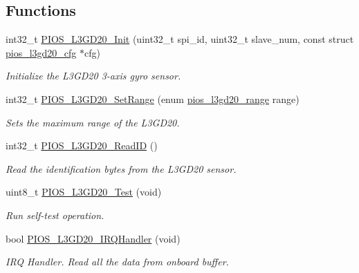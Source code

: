 \subsection*{\-Functions}
\begin{DoxyCompactItemize}
\item 
int32\-\_\-t \hyperlink{group___p_i_o_s___l3_g_d20_gac5608ef1d6d1c639969449e9613ed814}{\-P\-I\-O\-S\-\_\-\-L3\-G\-D20\-\_\-\-Init} (uint32\-\_\-t spi\-\_\-id, uint32\-\_\-t slave\-\_\-num, const struct \hyperlink{structpios__l3gd20__cfg}{pios\-\_\-l3gd20\-\_\-cfg} $\ast$cfg)
\begin{DoxyCompactList}\small\item\em \-Initialize the \-L3\-G\-D20 3-\/axis gyro sensor. \end{DoxyCompactList}\item 
int32\-\_\-t \hyperlink{group___p_i_o_s___l3_g_d20_ga26819f3aff62932a133ff618c3f25ee3}{\-P\-I\-O\-S\-\_\-\-L3\-G\-D20\-\_\-\-Set\-Range} (enum \hyperlink{group___p_i_o_s___l3_g_d20_ga704696d385abb591516d2e31301dad66}{pios\-\_\-l3gd20\-\_\-range} range)
\begin{DoxyCompactList}\small\item\em \-Sets the maximum range of the \-L3\-G\-D20. \end{DoxyCompactList}\item 
int32\-\_\-t \hyperlink{group___p_i_o_s___l3_g_d20_gacbb45ecd0888306f970c7a719cb372c2}{\-P\-I\-O\-S\-\_\-\-L3\-G\-D20\-\_\-\-Read\-I\-D} ()
\begin{DoxyCompactList}\small\item\em \-Read the identification bytes from the \-L3\-G\-D20 sensor. \end{DoxyCompactList}\item 
uint8\-\_\-t \hyperlink{group___p_i_o_s___l3_g_d20_ga9951dd9f920e6734bbce9117a983fed5}{\-P\-I\-O\-S\-\_\-\-L3\-G\-D20\-\_\-\-Test} (void)
\begin{DoxyCompactList}\small\item\em \-Run self-\/test operation. \end{DoxyCompactList}\item 
bool \hyperlink{group___p_i_o_s___l3_g_d20_ga27629f4a3a69cd7202e7effff4d9a2d2}{\-P\-I\-O\-S\-\_\-\-L3\-G\-D20\-\_\-\-I\-R\-Q\-Handler} (void)
\begin{DoxyCompactList}\small\item\em \-I\-R\-Q \-Handler. \-Read all the data from onboard buffer. \end{DoxyCompactList}\end{DoxyCompactItemize}


